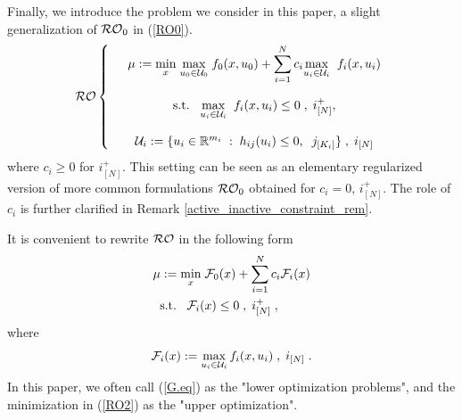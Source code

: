 \documentclass[journal,twoside,web]{ieeecolor}
\begin{document}
Finally, we introduce the problem we consider in this paper, a slight generalization of ${\cal RO}_0$ in (\ref{RO0}).
\begin{equation}{\cal RO}\left\{\begin{array}{ccc}
&\mu:=\underset{x}{\min} \;\underset{u_0\in {\cal U}_0}{\max}\; f_0(x,u_0)+\displaystyle\sum_{i=1}^N c_i \underset{u_i\in {\cal U}_i}{\max}\;\; f_i(x,u_i)\label{RO}\\ \\
&\text{s.t.}\;\;\;\underset{u_i\in {\cal U}_i}{\max}\;\; f_i(x,u_i)\leq 0\;,\;i^+_{[N]},\\ \\
&{\cal U}_i:=\{u_ i\in \mathbb{R}^{m_i}\;:\;h_{ij}(u_i)\leq 0,\;\;j_{[K_i]}\}\;,\;i_{[N]}
\end{array}\right.
\end{equation}
where $c_i\geq 0$ for $i^+_{[N]}$. This setting can be seen as an elementary regularized version of more common formulations ${\cal RO}_0$ obtained for $c_i=0$, $i_{[N]}^+$.
The role of $c_i$ is further clarified in Remark \ref{active_inactive_constraint_rem}.

It is convenient to rewrite ${\cal RO}$ in the following form
\begin{align}
&\mu:=\underset{x}{\min} \; {\cal F}_0(x)+\sum_{i=1}^N c_i{\cal F}_i(x)\label{RO2}\\
&\;\;\text{s.t.}\;\;\;{\cal F}_i(x)\leq 0\;,\;i^+_{[N]}\;,\nonumber
\end{align}
where
\begin{equation}\label{G.eq}
{\cal F}_i(x):=\max_{u_i\in {\cal U}_i} f_i(x,u_i)\;,\; i_{[N]}\;.
\end{equation}
In this paper, we often call (\ref{G.eq}) as the "lower optimization problems", and the minimization in (\ref{RO2}) as the "upper optimization".
\end{document}
